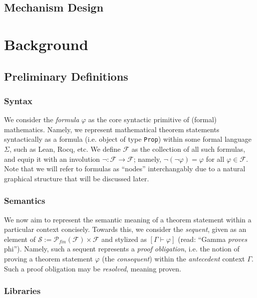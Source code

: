 \documentclass[letterpaper]{article} %
\renewcommand{\phi}{\varphi}
\newcommand{\proves}{\vdash}
\begin{document}
\subsection{Mechanism Design}



\section{Background}
\subsection{Preliminary Definitions}

\subsubsection{Syntax}

We consider the \textit{formula} $\phi$ as the core syntactic primitive of (formal) mathematics. Namely, we represent mathematical theorem statements syntactically as a formula (i.e. object of type \texttt{Prop}) within some formal language $\Sigma$, such as Lean, Rocq, etc. We define $\mathcal{F}$ as the collection of all such formulas, and equip it with an involution $\lnot : \mathcal{F}\rightarrow \mathcal{F}$; namely, $\lnot(\lnot\varphi)=\varphi$ for all $\varphi\in\mathcal{F}$. Note that we will refer to formulas as ``nodes'' interchangably due to a natural graphical structure that will be discussed later.

\subsubsection{Semantics}

We now aim to represent the semantic meaning of a theorem statement within a particular context concisely. Towards this, we consider the \textit{sequent}, given as an element of $\mathcal{S} := \mathcal{P}_{fin}(\mathcal{F}) \times \mathcal{F} $ and stylized as $[\Gamma \proves \phi]$ (read: ``Gamma \textit{proves} phi''). Namely, such a sequent represents a \textit{proof obligation}, i.e. the notion of proving a theorem statement $\phi$ (the \textit{consequent}) within the \textit{antecedent} context $\Gamma$. Such a proof obligation may be \textit{resolved}, meaning proven.

\subsubsection{Libraries}
\end{document}
